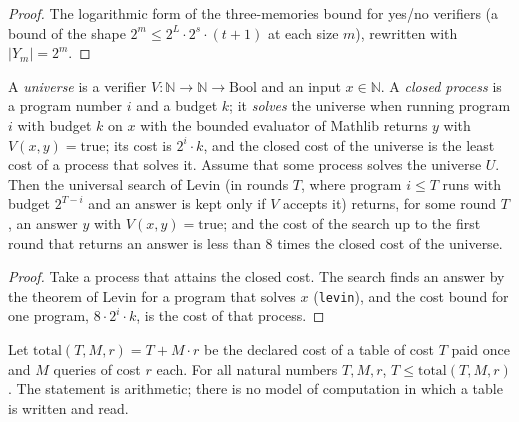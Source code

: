 \begin{proof}
  \leanok
  The logarithmic form of the three-memories bound for yes/no verifiers (a bound of the shape
  $2^m \le 2^{L} \cdot 2^{s} \cdot (t + 1)$ at each size $m$), rewritten with $|Y_m| = 2^m$.
\end{proof}

\begin{theorem}
  \label{thm:arrow-closed-universe}
  \leanok
  A \emph{universe} is a verifier $V : \mathbb{N} \to \mathbb{N} \to \mathrm{Bool}$ and an input
  $x \in \mathbb{N}$. A \emph{closed process} is a program number $i$ and a budget $k$; it
  \emph{solves} the universe when running program $i$ with budget $k$ on $x$ with the bounded evaluator
  of Mathlib returns $y$ with $V(x, y) = \mathrm{true}$; its cost is $2^i \cdot k$, and the closed cost of the universe
  is the least cost of a process that solves it. Assume that some process solves the universe $U$.
  Then the universal search of Levin (in rounds $T$, where program $i \le T$ runs with budget
  $2^{T - i}$ and an answer is kept only if $V$ accepts it) returns, for some round $T$, an answer $y$
  with $V(x, y) = \mathrm{true}$; and the cost of the search up to the first round that returns an
  answer is less than $8$ times the closed cost of the universe.
  \own{}
\end{theorem}

\begin{proof}
  \leanok
  Take a process that attains the closed cost. The search finds an answer by the theorem of Levin
  for a program that solves $x$ (\texttt{levin}), and the cost bound for one program, $8 \cdot 2^i
  \cdot k$, is the cost of that process.
\end{proof}

\begin{theorem}
  \label{thm:arrow-somebody-paid}
  \leanok
  Let $\mathrm{total}(T, M, r) = T + M \cdot r$ be the declared cost of a table of cost $T$ paid once
  and $M$ queries of cost $r$ each. For all natural numbers $T, M, r$, $T \le \mathrm{total}(T, M, r)$.
  The statement is arithmetic; there is no model of computation in which a table is written and read.
  \own{}
\end{theorem}

